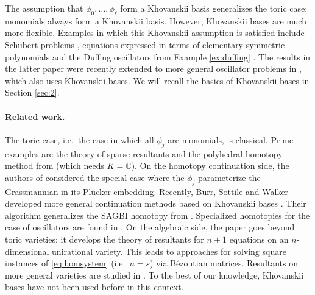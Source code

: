 \documentclass[12pt]{article}
\theoremstyle{definition}
\theoremstyle{remark}
\begin{document}
The assumption that $\phi_0, \ldots, \phi_\ell$ form a Khovanskii basis generalizes the toric case: monomials always form a Khovanskii basis. However, Khovanskii bases are much more flexible. Examples in which this Khovanskii assumption is satisfied include Schubert problems \cite{huber1998numerical}, equations expressed in terms of elementary symmetric polynomials \cite[p.~99]{sturmfelsgroebner} and the Duffing oscillators from Example \ref{ex:duffing} \cite{breiding2022algebraic}. The results in the latter paper were recently extended to more general oscillator problems in \cite{Viktoriia}, which also uses Khovanskii bases. We will recall the basics of Khovanskii bases in Section \ref{sec:2}. 

\paragraph{Related work.} 
The toric case, i.e.~the case in which all $\phi_j$ are monomials, is classical. Prime examples are the theory of sparse resultants \cite[Chapter 7]{cox2006using} and the polyhedral homotopy method from \cite{huber1995polyhedral} (which needs $K = \mathbb{C}$). On the homotopy continuation side, the authors of \cite{huber1998numerical} considered the special case where the $\phi_j$ parameterize the Grassmannian in its Pl\"ucker embedding. Recently, Burr, Sottile and Walker developed more general continuation methods based on Khovanskii bases \cite{burr2020numerical}. Their algorithm generalizes the SAGBI homotopy from \cite{huber1998numerical}. Specialized homotopies for the case of oscillators are found in \cite{breiding2022algebraic}. On the algebraic side, the paper \cite{buse2000generalized} goes beyond toric varieties: it develops the theory of resultants for $n + 1$ equations on an $n$-dimensional unirational variety. This leads to approaches for solving square instances of \eqref{eq:homsystem} (i.e.~$n = s$) via B\'ezoutian matrices. Resultants on more general varieties are studied in \cite{monin2020overdetermined}. To the best of our knowledge, Khovanskii bases have not been used before in this context. 
\end{document}
